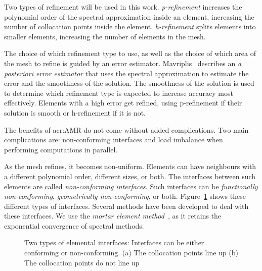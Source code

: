 Two types of refinement will be used in this work. \textit{p-refinement} increases the polynomial
order of the spectral approximation inside an element, increasing the number of collocation points
inside the element. \textit{h-refinement} splits elements into smaller elements, increasing the
number of elements in the mesh.

The choice of which refinement type to use, as well as the choice of which area of the mesh to
refine is guided by an error estimator. Mavriplis~\cite{Mavriplis1990} describes an \textit{a
posteriori error estimator} that uses the spectral approximation to estimate the error and the
smoothness of the solution. The smoothness of the solution is used to determine which refinement
type is expected to increase accuracy most effectively. Elements with a high error get refined, using
p-refinement if their solution is smooth or h-refinement if it is not.

The benefits of \acrshort{acr:AMR} do not come without added complications. Two main complications
are: non-conforming interfaces and load imbalance when performing computations in parallel.

As the mesh refines, it becomes non-uniform. Elements can have neighbours with a different
polynomial order, different sizes, or both. The interfaces between such elements are called
\textit{non-conforming interfaces}. Such interfaces can be \textit{functionally non-conforming},
\textit{geometrically non-conforming}, or both. Figure~\ref{fig:intro_interfaces} shows these
different types of interfaces. Several methods have been developed to deal with these interfaces. We
use the \textit{mortar element method}~\cite{Maday1989}, as it retains the exponential convergence
of spectral methods.

\begin{figure}[H]
    \centering
    \hfill
    \caption{Two types of elemental interfaces: Interfaces can be either conforming or
        non-conforming. (a) The collocation points line up (b) The collocation points do not line
        up}\label{fig:intro_interfaces}
\end{figure}

